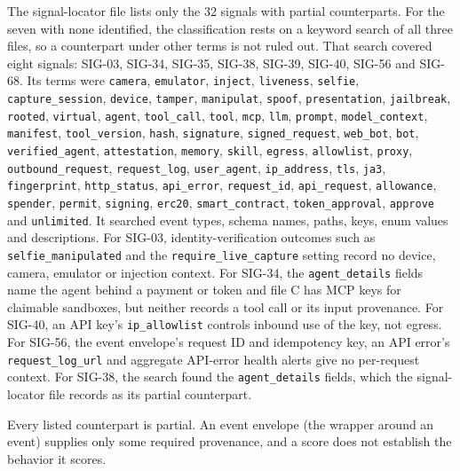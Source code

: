 \documentclass[
  11pt,
]{article}
\begin{document}
The signal-locator file lists only the 32 signals with partial
counterparts. For the seven with none identified, the classification
rests on a keyword search of all three files, so a counterpart under
other terms is not ruled out. That search covered eight signals:
\mbox{SIG-03}, \mbox{SIG-34}, \mbox{SIG-35}, \mbox{SIG-38},
\mbox{SIG-39}, \mbox{SIG-40}, \mbox{SIG-56} and \mbox{SIG-68}. Its terms
were \texttt{camera}, \texttt{emulator}, \texttt{inject},
\texttt{liveness}, \texttt{selfie}, \texttt{capture\_session},
\texttt{device}, \texttt{tamper}, \texttt{manipulat}, \texttt{spoof},
\texttt{presentation}, \texttt{jailbreak}, \texttt{rooted},
\texttt{virtual}, \texttt{agent}, \texttt{tool\_call}, \texttt{tool},
\texttt{mcp}, \texttt{llm}, \texttt{prompt}, \texttt{model\_context},
\texttt{manifest}, \texttt{tool\_version}, \texttt{hash},
\texttt{signature}, \texttt{signed\_request}, \texttt{web\_bot},
\texttt{bot}, \texttt{verified\_agent}, \texttt{attestation},
\texttt{memory}, \texttt{skill}, \texttt{egress}, \texttt{allowlist},
\texttt{proxy}, \texttt{outbound\_request}, \texttt{request\_log},
\texttt{user\_agent}, \texttt{ip\_address}, \texttt{tls}, \texttt{ja3},
\texttt{fingerprint}, \texttt{http\_status}, \texttt{api\_error},
\texttt{request\_id}, \texttt{api\_request}, \texttt{allowance},
\texttt{spender}, \texttt{permit}, \texttt{signing}, \texttt{erc20},
\texttt{smart\_contract}, \texttt{token\_approval}, \texttt{approve} and
\texttt{unlimited}. It searched event types, schema names, paths, keys,
enum values and descriptions. For \mbox{SIG-03}, identity-verification
outcomes such as \texttt{selfie\_manipulated} and the
\texttt{require\_live\_capture} setting record no device, camera,
emulator or injection context. For \mbox{SIG-34}, the
\texttt{agent\_details} fields name the agent behind a payment or token
and file C has MCP keys for claimable sandboxes, but neither records a
tool call or its input provenance. For \mbox{SIG-40}, an API key's
\texttt{ip\_allowlist} controls inbound use of the key, not egress. For
\mbox{SIG-56}, the event envelope's request ID and idempotency key, an
API error's \texttt{request\_log\_url} and aggregate API-error health
alerts give no per-request context. For \mbox{SIG-38}, the search found
the \texttt{agent\_details} fields, which the signal-locator file
records as its partial counterpart.

Every listed counterpart is partial. An event envelope (the wrapper
around an event) supplies only some required provenance, and a score
does not establish the behavior it scores.
\end{document}
